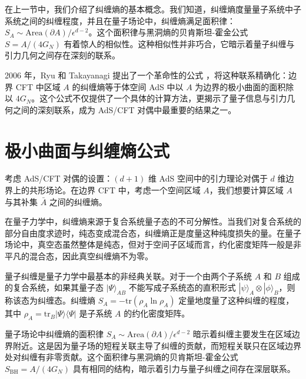 %
%

在上一节中，我们介绍了纠缠熵的基本概念。我们知道，纠缠熵度量量子系统中子系统之间的纠缠程度，并且在量子场论中，纠缠熵满足面积律：$S_A \sim \text{Area}(\partial A)/\epsilon^{d-2}$。这个面积律与黑洞熵的贝肯斯坦-霍金公式 $S = A/(4G_N)$ 有着惊人的相似性。这种相似性并非巧合，它暗示着量子纠缠与引力几何之间存在深刻的联系。

2006 年，Ryu 和 Takayanagi 提出了一个革命性的公式 \cite{Ryu2006}，将这种联系精确化：边界 CFT 中区域 $A$ 的纠缠熵等于体空间 AdS 中以 $A$ 为边界的极小曲面的面积除以 $4G_N$。这个公式不仅提供了一个具体的计算方法，更揭示了量子信息与引力几何之间的深刻联系，成为 AdS/CFT 对偶中最重要的结果之一。

\section{极小曲面与纠缠熵公式}

考虑 AdS/CFT 对偶的设置：$(d+1)$ 维 AdS 空间中的引力理论对偶于 $d$ 维边界上的共形场论。在边界 CFT 中，考虑一个空间区域 $A$，我们想要计算区域 $A$ 与其补集 $\bar{A}$ 之间的纠缠熵。

在量子力学中，纠缠熵来源于复合系统量子态的不可分解性。当我们对复合系统的部分自由度求迹时，纯态变成混合态，纠缠熵正是度量这种纯度损失的量。在量子场论中，真空态虽然整体是纯态，但对于空间子区域而言，约化密度矩阵一般是非平凡的混合态，因此真空纠缠熵不为零。

\begin{definition}[量子纠缠]
量子纠缠是量子力学中最基本的非经典关联。对于一个由两个子系统 $A$ 和 $B$ 组成的复合系统，如果其量子态 $|\Psi\rangle_{AB}$ 不能写成子系统态的直积形式 $|\psi\rangle_A \otimes |\phi\rangle_B$，则称该态为纠缠态。纠缠熵 $S_A = -\text{tr}(\rho_A \ln \rho_A)$ 定量地度量了这种纠缠的程度，其中 $\rho_A = \text{tr}_B |\Psi\rangle\langle\Psi|$ 是子系统 $A$ 的约化密度矩阵。
\end{definition}

\begin{remark}[面积律的物理起源]
量子场论中纠缠熵的面积律 $S_A \sim \text{Area}(\partial A)/\epsilon^{d-2}$ 暗示着纠缠主要发生在区域边界附近。这是因为量子场的短程关联主导了纠缠的贡献，而短程关联只在区域边界处对纠缠有非零贡献。这个面积律与黑洞熵的贝肯斯坦-霍金公式 $S_{\text{BH}} = A/(4G_N)$ 具有相同的结构，暗示着引力与量子纠缠之间存在深层联系。
\end{remark}

